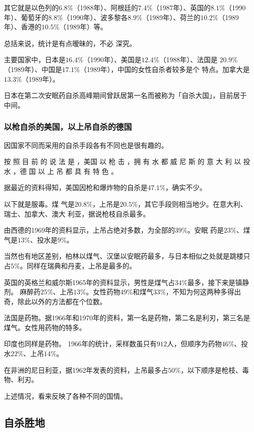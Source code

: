 \documentclass[UTF8]{ctexart}
\begin{document}
其它就是以色列的$6.8\%$（1988年）、阿根廷的$7.4\%$（1987年）、英国的$8.1\%$（1990年）、葡萄牙的$8.8\%$（1990年）、波多黎各$8.9\%$（1989年）、荷兰的$10.2\%$（1989年）、香港的$10.5\%$（1989年）等。

总括来说，统计是有点暧昧的，不必 深究。

主要国家中，日本是$16.4\%$（1990年）、美国是$12.4\%$（1988年）、法国是 $20.9\%$（1989年）、中国是$17.1\%$（1989年），中国的女性自杀者较多是个 特点。加拿大是$13.3\%$（1989年）。

日本在第二次安眠药自杀高峰期间曾跃居第一名而被称为「自杀大国」，目前居于中间。

\subsubsection*{以枪自杀的美国，以上吊自杀的德国}

因国家不同而采用的自杀手段各有不同也是很有趣的。

按 照 目 前 的 说 法 是 ，美国 以 枪 击 ，拥 有 水 都 威 尼 斯 的 意 大 利 以 投 水 ，德 国 以 上 吊 都 具 有 特 色 。

据最近的资料得知，美国因枪和爆炸物的自杀是$47.1\%$，确实不少。

以下就是服毒。煤 气是$20.8\%$，上吊是$20.5\%$，其它手段则相当地少。在意大利、瑞士、加拿大、澳大 利亚，据说枪枝自杀最多。

由西德的1969年的资料显示，上吊占绝对多数，为全部的$39\%$。安眠 药是$23\%$、煤气是$13\%$、投水是$9\%$。

当然也有地区差别，柏林以煤气、汉堡以安眠药最多，与日本相似之处就是跳楼只占$5\%$。同样在瑞典和丹麦，上吊是最多的。

英国的英格兰和威尔斯1965年的资料显示，男性是煤气占$34\%$最多，接下来是镇静剂。 
麻醉药$25\%$、上吊$13\%$。女性药物$49\%$和煤气$33\%$，不知为何这两种多得出奇，除此以外的方法都在个位数。

法国是药物。据1966年和1970年的资料，第一名是药物，第二名是利刃，第三名是煤气。女性用药物的特多。

印度也同样是药物。
1966年的统计，采样数虽只有$912$人，但顺序为药物$46\%$、投水$22\%$、上吊$14\%$。

在非洲的尼日利亚，据1962年发表的资料，上吊最多占$50\%$，以下顺序是枪枝、毒物、利刃。

上述情况，看来反映了各种不同的国情。

\subsection{自杀胜地}
\end{document}
